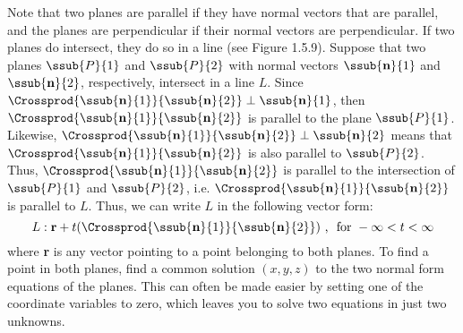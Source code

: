 \piccaption[]{}
Note that two planes are parallel if they have normal vectors that are parallel, and the planes are perpendicular if
their normal vectors are perpendicular. If two planes do intersect, they do so in a line (see Figure 1.5.9). Suppose
that two planes $\ssub{P}{1}$ and $\ssub{P}{2}$ with normal vectors $\ssub{\textbf{n}}{1}$ and $\ssub{\textbf{n}}{2}$,
respectively, intersect in a line $L$. Since $\Crossprod{\ssub{\textbf{n}}{1}}{\ssub{\textbf{n}}{2}} \perp
\ssub{\textbf{n}}{1}$, then $\Crossprod{\ssub{\textbf{n}}{1}}{\ssub{\textbf{n}}{2}}$ is parallel to the plane
$\ssub{P}{1}$. Likewise, $\Crossprod{\ssub{\textbf{n}}{1}}{\ssub{\textbf{n}}{2}} \perp \ssub{\textbf{n}}{2}$ means
that $\Crossprod{\ssub{\textbf{n}}{1}}{\ssub{\textbf{n}}{2}}$ is also parallel to $\ssub{P}{2}$. Thus,
$\Crossprod{\ssub{\textbf{n}}{1}}{\ssub{\textbf{n}}{2}}$ is parallel to the intersection of $\ssub{P}{1}$ and
$\ssub{P}{2}$, i.e. $\Crossprod{\ssub{\textbf{n}}{1}}{\ssub{\textbf{n}}{2}}$ is parallel to $L$. Thus, we can
write $L$ in the following vector form:
\begin{equation}
 L: \textbf{r} + t(\Crossprod{\ssub{\textbf{n}}{1}}{\ssub{\textbf{n}}{2}}) \text{~,~~for~} -\infty < t < \infty
\end{equation}
where \textbf{r} is any vector pointing to a point belonging to both planes. To find a point in both planes,
find a common solution $(x,y,z)$ to the two normal form equations of the planes. This can often be made easier
by setting one of the coordinate variables to zero, which leaves you to solve two equations in just two unknowns.

